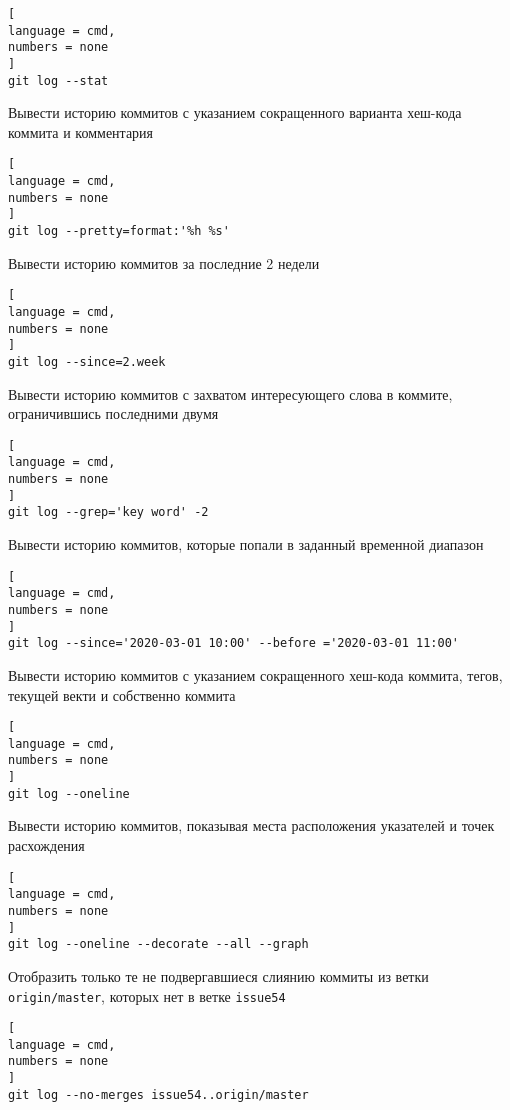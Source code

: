 \documentclass[%
	11pt,
	a4paper,
	utf8,
		]{article}
\begin{document}
\begin{lstlisting}[
language = cmd,
numbers = none
]
git log --stat
\end{lstlisting}

Вывести историю коммитов с указанием сокращенного варианта хеш-кода коммита и комментария

\begin{lstlisting}[
language = cmd,
numbers = none
]
git log --pretty=format:'%h %s'
\end{lstlisting}


Вывести историю коммитов за последние 2 недели

\begin{lstlisting}[
language = cmd,
numbers = none
]
git log --since=2.week
\end{lstlisting}


Вывести историю коммитов с захватом интересующего слова в коммите, ограничившись последними двумя

\begin{lstlisting}[
language = cmd,
numbers = none
]
git log --grep='key word' -2
\end{lstlisting}


Вывести историю коммитов, которые попали в заданный временной диапазон

\begin{lstlisting}[
language = cmd,
numbers = none
]
git log --since='2020-03-01 10:00' --before ='2020-03-01 11:00'
\end{lstlisting}


Вывести историю коммитов с указанием сокращенного хеш-кода коммита, тегов, текущей векти и собственно коммита

\begin{lstlisting}[
language = cmd,
numbers = none
]
git log --oneline
\end{lstlisting}


Вывести историю коммитов, показывая места расположения указателей и точек расхождения

\begin{lstlisting}[
language = cmd,
numbers = none
]
git log --oneline --decorate --all --graph
\end{lstlisting}

Отобразить только те не подвергавшиеся слиянию коммиты из ветки \texttt{origin/master}, которых нет в ветке \texttt{issue54}

\begin{lstlisting}[
language = cmd,
numbers = none
]
git log --no-merges issue54..origin/master
\end{lstlisting}
\end{document}
